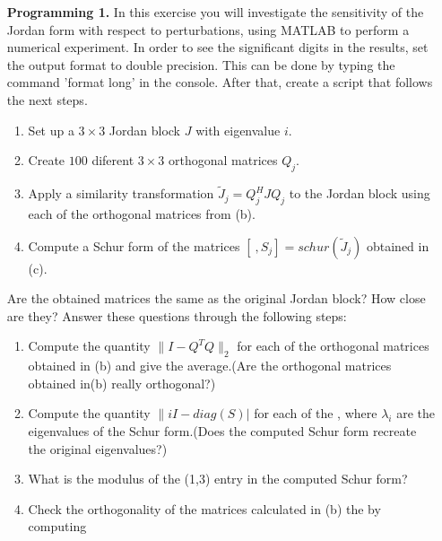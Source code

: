 \documentclass[14pt]{report}
\begin{document}
\begin{enumerate}
  \item[\textbf{Programming 1.}] In this exercise you will investigate the
    sensitivity of the Jordan form with respect to perturbations, using MATLAB
    to perform a numerical experiment. In order to see the significant
    digits in the results, set the output format to double precision. This can
    be done by typing the command 'format long' in the console. After that,
    create a script that follows the next steps.
    \begin{enumerate}
      \item Set up a $3\times3$ Jordan block $J$ with eigenvalue $i$.
      \item Create $100$ diferent $3\times3$ orthogonal matrices $Q_j$.
      \item Apply a similarity transformation $\tilde{J}_j=Q^H_jJQ_j$ to the
        Jordan block using each of the orthogonal matrices from (b).
      \item Compute a Schur form of the matrices $[~,S_j]=schur(\tilde{J}_j)$ obtained in (c).
    \end{enumerate}
    Are the obtained matrices the same as the original Jordan block? How
    close are they? Answer these questions through the following steps:
    \begin{enumerate}
        \item Compute the quantity $\|I-Q^TQ\|_2$ for each of the orthogonal
          matrices obtained in (b) and give the average.(Are the orthogonal
          matrices obtained in(b) really orthogonal?)
        \item Compute the quantity $\|iI-diag(S)|$ for each of the , where $\lambda_i$ are the
          eigenvalues of the Schur form.(Does the computed Schur form recreate
          the original eigenvalues?)
        \item What is the modulus of the (1,3) entry in the computed Schur form?
\item Check the orthogonality of the matrices calculated in (b) the by
        computing
      \end{enumerate}

  \end{enumerate}
\end{document}
